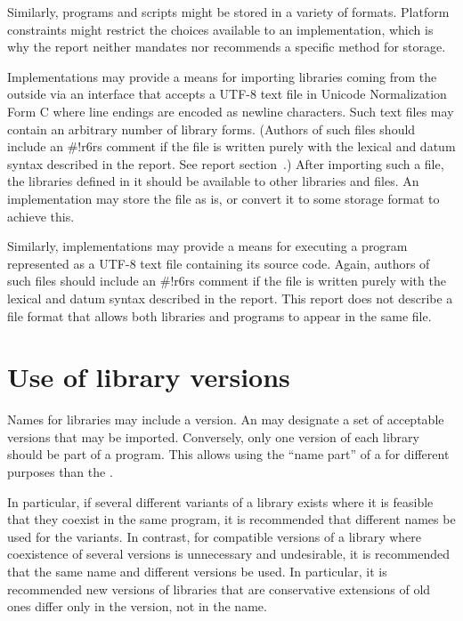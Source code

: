 \documentclass[twoside,twocolumn]{algol60}
\begin{document}
Similarly, programs and scripts might be stored in a variety of
formats.  Platform constraints might restrict the choices available to
an implementation, which is why the report neither mandates nor
recommends a specific method for storage.

Implementations may provide a means for importing libraries coming
from the outside via an interface that accepts a UTF-8 text file in
Unicode Normalization Form C where line endings are encoded as newline
characters.  Such text files may contain an arbitrary number of
library forms.  (Authors of such files should include an
{\cf\#!r6rs} comment if the file is written purely with the lexical
and datum syntax described in the report.  See report
section~.)  After importing such a file, the libraries defined in
it should be available to other libraries and files.  An
implementation may store the file as is, or convert it to some storage
format to achieve this.

Similarly, implementations may provide a means for executing a program
represented as a UTF-8 text file containing its source code.  Again,
authors of such files should include an {\cf\#!r6rs}
comment if the file is written purely with the lexical and datum syntax
described in the report.  This report does not describe a file format
that allows both libraries and programs to appear in the same file.

\chapter{Use of library versions}

Names for libraries may include a version.  An  may
designate a set of acceptable versions that may be imported.
Conversely, only one version of each library should be part of a
program.  This allows using the ``name part'' of a  for different purposes than the . 

In particular, if several different variants of a library exists where
it is feasible that they coexist in the same program, it is
recommended that different names be used for the variants.  In
contrast, for compatible versions of a library where coexistence of
several versions is unnecessary and undesirable, it is recommended
that the same name and different versions be used.  In particular, it
is recommended new versions of libraries that are conservative
extensions of old ones differ only in the version, not in the name.
\end{document}
